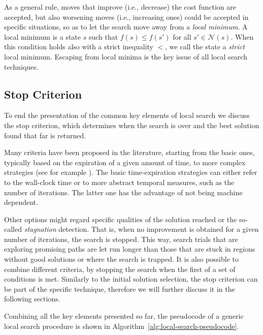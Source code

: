 As a general rule, moves that improve (i.e., decrease) the cost function are
accepted, but also worsening moves (i.e., increasing ones) could be accepted in specific
situations, so as to let the search move away from a \emph{local minimum}.
A local minimum is a state $s$ such that $f(s) \leq f(s')$ for all $s'
\in \mathcal{N}(s)$. When this condition holds also with a strict inequality $<$, 
we call the state a \emph{strict} local minimum. Escaping from local minima is the key issue of all local search techniques.

\subsection{Stop Criterion}\label{sec:stop-criteria}

To end the presentation of the common key elements of local search
we discuss the stop criterion, which determines when the search
is over and the best solution found that far is returned.

Many criteria have been proposed in the literature, starting from the
basic ones, typically based on the expiration of a given amount of time, 
to more complex strategies (see for example \cite[Sect.~3.2]{FrSt19}).
The basic time-expiration strategies can either refer to the wall-clock time or to more
abstract temporal measures, such as the number of iterations. The latter one has the 
advantage of not being machine dependent.

Other options might regard specific qualities of the solution reached
or the so-called \emph{stagnation} detection. That is, when no
improvement is obtained for a given number of iterations, the search is
stopped.  This way, search trials that are exploring promising paths
are let run longer than those that are stuck in regions without good
solutions or where the search is trapped.  It is also possible to
combine different criteria, by stopping the search when the first of a
set of conditions is met.  Similarly to the initial solution
selection, the stop criterion can be part of the specific technique,
therefore we will further discuss it in the following sections.
\vspace{\parskip}

Combining all the key elements presented so far, the pseudocode of a generic local search procedure is shown in
Algorithm~\ref{alg:local-search-pseudocode}.

